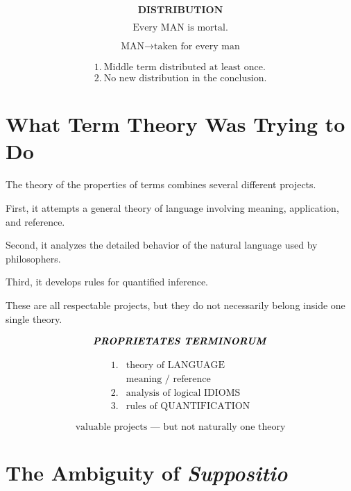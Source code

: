 \documentclass[11pt]{article}
\newcommand{\latin}[1]{\textit{#1}}
\begin{document}
\begin{whiteboard}
\[
\textbf{DISTRIBUTION}
\]

\[
\text{Every MAN is mortal.}
\]

\[
\text{MAN}
\rightarrow
\text{taken for every man}
\]

\[
\boxed{
\begin{array}{l}
1.\ \text{Middle term distributed at least once.}\\
2.\ \text{No new distribution in the conclusion.}
\end{array}
}
\]
\end{whiteboard}

\section{What Term Theory Was Trying to Do}

The theory of the properties of terms combines several different
projects.

First, it attempts a general theory of language involving meaning,
application, and reference.

Second, it analyzes the detailed behavior of the natural language
used by philosophers.

Third, it develops rules for quantified inference.

These are all respectable projects, but they do not necessarily
belong inside one single theory.

\begin{whiteboard}
\[
\textbf{\latin{PROPRIETATES TERMINORUM}}
\]

\[
\begin{array}{ll}
1. & \text{theory of LANGUAGE}\\
   & \text{meaning / reference}\\[0.5em]
2. & \text{analysis of logical IDIOMS}\\[0.5em]
3. & \text{rules of QUANTIFICATION}
\end{array}
\]

\[
\boxed{\text{valuable projects --- but not naturally one theory}}
\]
\end{whiteboard}

\section{The Ambiguity of \textit{Suppositio}}
\end{document}
